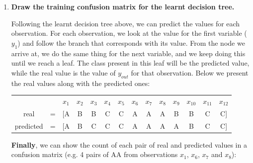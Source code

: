 \documentclass[12pt]{article}
\begin{document}
\begin{enumerate}[leftmargin=\labelsep]
  \item \textbf{Draw the training confusion matrix for the learnt decision tree.}

        \vskip 0.3cm
        Following the learnt decision tree above, we can predict the values for each observation.
        For each observation, we look at the value for the first variable ($y_1$) and follow the branch that corresponds with its value.
        From the node we arrive at, we do the same thing for the next variable, and we keep doing this until we reach a leaf.
        The class present in this leaf will be the predicted value, while the real value is the value of $y_{out}$ for that observation.
        Below we present the real values along with the predicted ones:

        \begin{center}
          \begin{tabular}{cccccccccccccc}
            \multicolumn{2}{c}{}       & $x_1$ & $x_2$ & $x_3$ & $x_4$ & $x_5$ & $x_6$ & $x_7$ & $x_8$ & $x_9$ & $x_{10}$ & $x_{11}$ & $x_{12}$      \\
            \multirow{1}{*}{real}      & =     & [A    & B     & B     & C     & C     & A     & A     & A     & B        & B        & C        & C] \\
            \multirow{1}{*}{predicted} & =     & [A    & B     & C     & C     & C     & A     & A     & A     & A        & B        & C        & C]
          \end{tabular}
        \end{center}

        \textbf{Finally}, we can show the count of each pair of real and predicted values in a confusion matrix (e.g. 4 pairs of AA from observations $x_1$, $x_6$, $x_7$ and $x_8$):


\end{enumerate}
\end{document}
